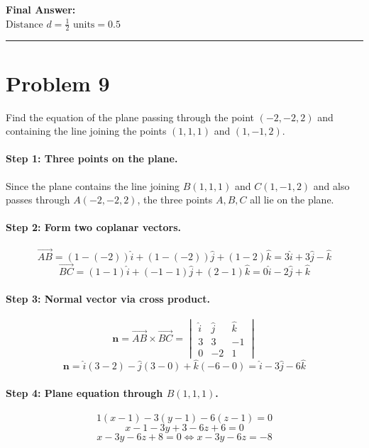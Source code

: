 \documentclass[11pt,a4paper]{article}
\begin{document}
\begin{resultbox}
\textbf{Final Answer:}\\
$\boxed{\text{Distance } d = \frac{1}{2} \text{ units} = 0.5}$
\end{resultbox}

\vspace{0.4cm}
\hrule
\vspace{0.4cm}

\section{Problem 9}
\begin{problembox}[Problem 9]
Find the equation of the plane passing through the point $(-2, -2, 2)$ and containing the line joining the points $(1, 1, 1)$ and $(1, -1, 2)$.
\end{problembox}

\paragraph{Step 1: Three points on the plane.}
Since the plane contains the line joining $B(1, 1, 1)$ and $C(1, -1, 2)$ and also passes through $A(-2, -2, 2)$, the three points $A, B, C$ all lie on the plane.

\paragraph{Step 2: Form two coplanar vectors.}
$$\vec{AB} = (1 - (-2))\hat{i} + (1 - (-2))\hat{j} + (1 - 2)\hat{k} = 3\hat{i} + 3\hat{j} - \hat{k}$$
$$\vec{BC} = (1 - 1)\hat{i} + (-1 - 1)\hat{j} + (2 - 1)\hat{k} = 0\hat{i} - 2\hat{j} + \hat{k}$$

\paragraph{Step 3: Normal vector via cross product.}
$$\mathbf{n} = \vec{AB} \times \vec{BC} = \begin{vmatrix} \hat{i} & \hat{j} & \hat{k} \\ 3 & 3 & -1 \\ 0 & -2 & 1 \end{vmatrix}$$
$$\mathbf{n} = \hat{i}(3 - 2) - \hat{j}(3 - 0) + \hat{k}(-6 - 0) = \hat{i} - 3\hat{j} - 6\hat{k}$$

\paragraph{Step 4: Plane equation through $B(1, 1, 1)$.}
$$1(x - 1) - 3(y - 1) - 6(z - 1) = 0$$
$$x - 1 - 3y + 3 - 6z + 6 = 0$$
$$x - 3y - 6z + 8 = 0 \iff x - 3y - 6z = -8$$
\end{document}
